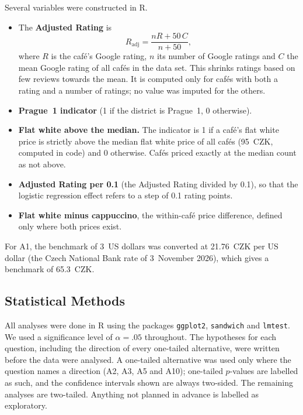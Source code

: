 \documentclass[11pt,a4paper]{article}
\begin{document}
Several variables were constructed in R.
\begin{itemize}
  \item The \textbf{Adjusted Rating} is
  \[
    R_{\text{adj}} = \frac{nR + 50\,C}{n + 50},
  \]
  where $R$ is the caf\'e's Google rating, $n$ its number of Google ratings and $C$ the mean Google rating of all caf\'es in the data set. This shrinks ratings based on few reviews towards the mean. It is computed only for caf\'es with both a rating and a number of ratings; no value was imputed for the others.
  \item \textbf{Prague~1 indicator} (1 if the district is Prague~1, 0 otherwise).
  \item \textbf{Flat white above the median.} The indicator is 1 if a caf\'e's flat white price is strictly above the median flat white price of all caf\'es (95~CZK, computed in code) and 0 otherwise. Caf\'es priced exactly at the median count as not above.
  \item \textbf{Adjusted Rating per 0.1} (the Adjusted Rating divided by 0.1), so that the logistic regression effect refers to a step of 0.1 rating points.
  \item \textbf{Flat white minus cappuccino}, the within-caf\'e price difference, defined only where both prices exist.
\end{itemize}

For A1, the benchmark of 3~US dollars was converted at 21.76~CZK per US dollar (the Czech National Bank rate of 3~November 2026), which gives a benchmark of 65.3~CZK.

\subsection{Statistical Methods}

All analyses were done in R using the packages \texttt{ggplot2}, \texttt{sandwich} and \texttt{lmtest}. We used a significance level of $\alpha = .05$ throughout. The hypotheses for each question, including the direction of every one-tailed alternative, were written before the data were analysed. A one-tailed alternative was used only where the question names a direction (A2, A3, A5 and A10); one-tailed $p$-values are labelled as such, and the confidence intervals shown are always two-sided. The remaining analyses are two-tailed. Anything not planned in advance is labelled as exploratory.
\end{document}
